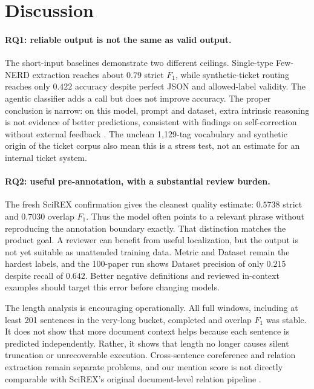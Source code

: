 \section{Discussion}
\label{sec:discussion}

\paragraph{RQ1: reliable output is not the same as valid output.}
The short-input baselines demonstrate two different ceilings. Single-type
Few-NERD extraction reaches about $0.79$ strict $F_1$, while synthetic-ticket
routing reaches only $0.422$ accuracy despite perfect JSON and allowed-label
validity. The agentic classifier adds a call but does not improve accuracy. The
proper conclusion is narrow: on this model, prompt and dataset, extra intrinsic
reasoning is not evidence of better predictions, consistent with findings on
self-correction without external feedback \citep{huang2024selfcorrect}. The
unclean 1{,}129-tag vocabulary and synthetic origin of the ticket corpus also
mean this is a stress test, not an estimate for an internal ticket system.

\paragraph{RQ2: useful pre-annotation, with a substantial review burden.}
The fresh SciREX confirmation gives the cleanest quality estimate: $0.5738$
strict and $0.7030$ overlap $F_1$. Thus the model often points to a relevant
phrase without reproducing the annotation boundary exactly. That distinction
matches the product goal. A reviewer can benefit from useful localization, but
the output is not yet suitable as unattended training data. Metric and Dataset
remain the hardest labels, and the 100-paper run shows Dataset precision of only
$0.215$ despite recall of $0.642$. Better negative definitions and reviewed
in-context examples should target this error before changing models.

The length analysis is encouraging operationally. All full windows, including
at least 201 sentences in the very-long bucket, completed and overlap $F_1$ was
stable. It does not show that more document context helps because each sentence
is predicted independently. Rather, it shows that length no longer causes silent
truncation or unrecoverable execution. Cross-sentence coreference and relation
extraction remain separate problems, and our mention score is not directly
comparable with SciREX's original document-level relation pipeline
\citep{jain2020scirex}.


